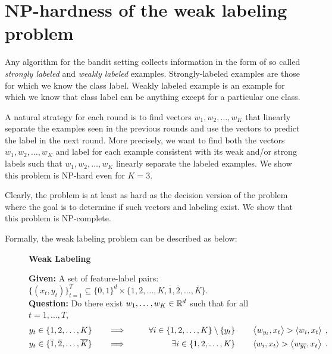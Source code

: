\section{NP-hardness of the weak labeling problem}

Any algorithm for the bandit setting collects information in the form of so
called \emph{strongly labeled} and \emph{weakly labeled} examples.
Strongly-labeled examples are those for which we know the class label. Weakly
labeled example is an example for which we know that class label can be anything
except for a particular one class.

A natural strategy for each round is to find vectors $w_1, w_2, \dots, w_K$ that
linearly separate the examples seen in the previous rounds and use the vectors
to predict the label in the next round. More precisely, we want to find both the
vectors $w_1, w_2, \dots, w_K$ and label for each example consistent with its
weak and/or strong labels such that $w_1, w_2, \dots, w_K$ linearly separate the
labeled examples. We show this problem is NP-hard even for $K=3$.

Clearly, the problem is at least as hard as the decision version of the problem
where the goal is to determine if such vectors and labeling exist. We show that
this problem is NP-complete.

Formally, the weak labeling problem can be described as below:
\begin{figure}[H]
\begin{framed}
\begin{center}
    \textbf{Weak Labeling}
\end{center}
\textbf{Given: } A set of feature-label pairs: $\{(x_t, y_t)\}_{t=1}^T \subseteq \{0,1\}^d \times \{1,2,\ldots, K, \overline{1}, \overline{2}, \ldots, \overline{K}\}$. \\
\textbf{Question: } Do there exist $ w_1, \ldots, w_K \in \mathbb{R}^d$ such that for all $t=1, \ldots, T$,
\begin{align*}
y_t \in \{1,2,\dots,K\} \qquad & \Longrightarrow \qquad & \forall i \in \{1,2,\dots,K\} \setminus \{y_t\} \qquad & \left\langle w_{y_t}, x_t \right\rangle  > \left\langle w_i, x_t \right\rangle \; , \\
y_t \in \{\overline{1}, \overline{2},\dots, \overline{K}\} \qquad & \Longrightarrow & \qquad \exists i \in \{1,2,\dots,K\} \qquad & \left\langle w_i, x_t \right\rangle > \left\langle w_{\overline{y_t}}, x_t \right\rangle \; .
\end{align*}
\end{framed}
\end{figure}


